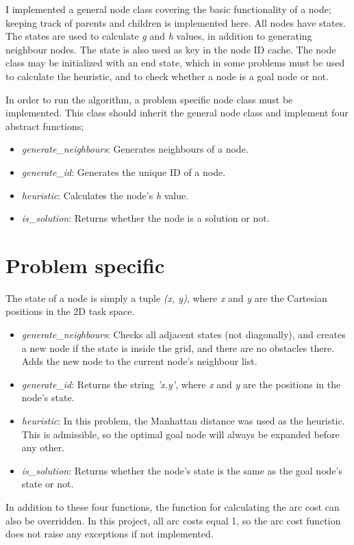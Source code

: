 \documentclass{article}
\begin{document}
I implemented a general node class covering the basic functionality of a node; keeping track of parents and children is implemented here. All nodes have states. The states are used to calculate \textit{g} and \textit{h} values, in addition to generating neighbour nodes. The state is also used as key in the node ID cache. The node class may be initialized with an end state, which in some problems must be used to calculate the heuristic, and to check whether a node is a goal node or not.

In order to run the algorithm, a problem specific node class must be implemented. This class should inherit the general node class and implement four abstract functions;
\begin{itemize}
	\item \textit{generate\_neighbours}: Generates neighbours of a node.
	\item \textit{generate\_id}: Generates the unique ID of a node.
	\item \textit{heuristic}: Calculates the node's \textit{h} value.
	\item \textit{is\_solution}: Returns whether the node is a solution or not.
\end{itemize}

\section*{Problem specific}
The state of a node is simply a tuple \textit{(x, y)}, where \textit{x} and \textit{y} are the Cartesian positions in the 2D task space.
\begin{itemize}
	\item \textit{generate\_neighbours}: Checks all adjacent states (not diagonally), and creates a new node if the state is inside the grid, and there are no obstacles there. Adds the new node to the current node's neighbour list.
	\item \textit{generate\_id}: Returns the string \textit{'x.y'}, where \textit{x} and \textit{y} are the positions in the node's state.
	\item \textit{heuristic}: In this problem, the Manhattan distance was used as the heuristic. This is admissible, so the optimal goal node will always be expanded before any other.
	\item \textit{is\_solution}: Returns whether the node's state is the same as the goal node's state or not.
\end{itemize}

In addition to these four functions, the function for calculating the arc cost can also be overridden. In this project, all arc costs equal 1, so the arc cost function does not raise any exceptions if not implemented.

\end{document}
